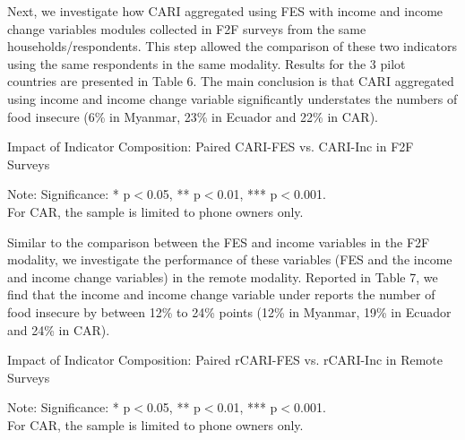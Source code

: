 \documentclass[11pt,harvard]{article}
\begin{document}
Next, we investigate how CARI aggregated using FES with income and income change variables modules collected in F2F surveys from the same households/respondents. This step allowed the comparison of these two indicators using the same respondents in the same modality. Results for the 3 pilot countries are presented in Table 6. The main conclusion is that CARI aggregated using income and income change variable significantly understates the numbers of food insecure (6\% in Myanmar, 23\% in Ecuador and 22\% in CAR).

\begin{table}[htbp]
	\centering
	\begin{adjustbox}{max width=\textwidth}
		\begin{threeparttable}
			\caption{Impact of Indicator Composition: Paired CARI-FES vs. CARI-Inc in F2F Surveys}
			\scriptsize
			 
			\label{tab:Paired_F2F_CARI_FES_INC_All_Country}
			\begin{tablenotes}
				\item Note: Significance: * p$<$0.05, ** p$<$0.01, *** p$<$0.001. \\
				For CAR, the sample is limited to phone owners only.
			\end{tablenotes}
		\end{threeparttable}
	\end{adjustbox}
\end{table}

Similar to the comparison between the FES and income variables in the F2F modality, we investigate the performance of these variables (FES and the income and income change variables) in the remote modality. Reported in Table 7, we find that the income and income change variable under reports the number of food insecure by between 12\% to 24\% points (12\% in Myanmar, 19\% in Ecuador and 24\% in CAR). 

\begin{table}[htbp]
	\centering
	\begin{adjustbox}{max width=\textwidth}
		\begin{threeparttable}
			\caption{Impact of Indicator Composition: Paired rCARI-FES vs. rCARI-Inc in Remote Surveys}
			\scriptsize
			 
			\label{tab:Paired_RM_rCARI_FES_INC_All_Country}
			\begin{tablenotes}
				\item Note: Significance: * p$<$0.05, ** p$<$0.01, *** p$<$0.001. \\
				For CAR, the sample is limited to phone owners only.
			\end{tablenotes}
		\end{threeparttable}
	\end{adjustbox}
\end{table}
\end{document}
